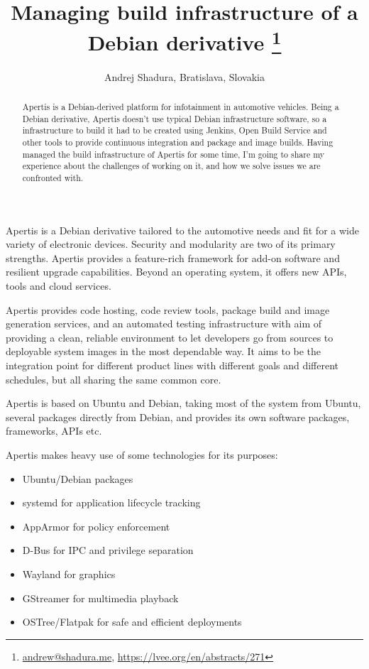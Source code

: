 \documentclass[10pt, a5paper]{article}
\begin{document}
\title{Managing build infrastructure of a Debian derivative
\footnote{\url{andrew@shadura.me}, \url{https://lvee.org/en/abstracts/271}}}
\author{Andrej Shadura, Bratislava, Slovakia}
\maketitle
\begin{abstract}
Apertis is a Debian-derived platform for infotainment in auto\-motive vehicles.
Being a Debian derivative, Apertis doesn’t use typical Debian infrastructure software, so a infrastructure to build it had to be created using Jenkins, Open Build Service and other tools to provide continuous integration and package and image builds. Having managed the build infrastructure of Apertis for some time, I’m going to share my experience about the challenges of working on it, and how we solve issues we are confronted with.
\end{abstract}

Apertis is a Debian derivative tailored to the automotive needs and fit for a wide variety of electronic devices. Security and modularity are two of its primary strengths. Apertis provides a feature-rich framework for add-on software and resilient upgrade capabilities. Beyond \linebreak an operating system, it offers new APIs, tools and cloud services.

Apertis provides code hosting, code review tools, package build and image generation services, and an automated testing infrastructure with aim of providing a clean, reliable environment to let developers go from sources to deployable system images in the most dependable way. It aims to be the integration point for different product lines with different goals and different schedules, but all sharing the same common core.

Apertis is based on Ubuntu and Debian, taking most of the system from Ubuntu, several packages directly from Debian, and provides its own software packages, frameworks, APIs etc.

Apertis makes heavy use of some technologies for its purposes:

\begin{itemize}
  \item Ubuntu/Debian packages
  \item systemd for application lifecycle tracking
  \item AppArmor for policy enforcement
  \item D-Bus for IPC and privilege separation
  \item Wayland for graphics
  \item GStreamer for multimedia playback
  \item OSTree/Flatpak for safe and efficient deployments
\end{itemize}
\end{document}
